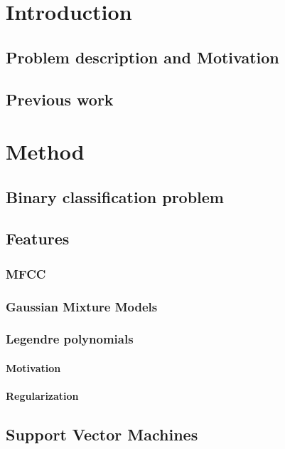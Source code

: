 \documentclass[11pt,a4paper]{tesis}
\begin{document}
\tableofcontents
\chapter{Introduction}
	\section{Problem description and Motivation}
		
	\section{Previous work}
		
\chapter{Method}
	\section{Binary classification problem}
		
	\section{Features}
		\subsection{MFCC}
			
		\subsection{Gaussian Mixture Models}
			
		\subsection{Legendre polynomials}
			
			\subsubsection{Motivation}
				
			\subsubsection{Regularization}
				
	\section{Support Vector Machines}
		
\end{document}
